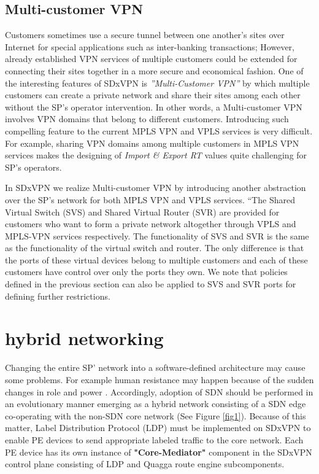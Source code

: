 \documentclass[10pt,conference]{IEEEtran}
\begin{document}
\subsection{Multi-customer VPN}


Customers sometimes use a secure tunnel between one another's sites over Internet 
for special applications such as inter-banking transactions; However, already established VPN services of multiple customers could be extended for connecting their sites together in a more secure and economical 
fashion. One of the interesting features of SDxVPN is \textit{''Multi-Customer VPN''} by which multiple customers 
can create a private network and share their sites among each other without the SP's operator intervention. 
In other words, a Multi-customer VPN involves VPN domains that belong to different customers.
Introducing such compelling feature to the current MPLS VPN and VPLS services is very difficult.
For example,
sharing VPN domains among multiple customers in MPLS VPN services
makes the designing of \textit{Import \& Export RT} values quite challenging for SP's operators.

In SDxVPN we realize Multi-customer VPN by introducing another abstraction over the SP's network for both MPLS VPN and VPLS services.  
“The Shared Virtual Switch (SVS) and Shared Virtual Router (SVR) 
are provided for customers who want to form a private network altogether through VPLS and 
MPLS-VPN services respectively. The functionality of SVS and SVR 
is the same as the functionality of the virtual switch and router. 
The only difference is that the ports of these virtual devices belong to multiple customers 
and each of these customers have control over only the ports they own. 
We note that policies defined in the previous section can also be 
applied to SVS and SVR ports for defining further restrictions.


\section{hybrid networking}\label{sec:3}

Changing the entire SP’ network into a software-defined architecture may cause some problems. For example human resistance may happen because of the sudden changes in role and power \cite{15}. Accordingly, adoption of SDN should be performed in an evolutionary manner emerging as a hybrid network consisting of a SDN edge co-operating with the non-SDN core network (See Figure \ref {fig1}). Because of this matter, Label Distribution Protocol (LDP) \cite{18} must be implemented on SDxVPN to enable PE devices to send appropriate labeled traffic to the core network. Each PE device has its own instance of \textbf{"Core-Mediator"} component in the SDxVPN control plane consisting of LDP and Quagga route engine subcomponents. 
\end{document}

